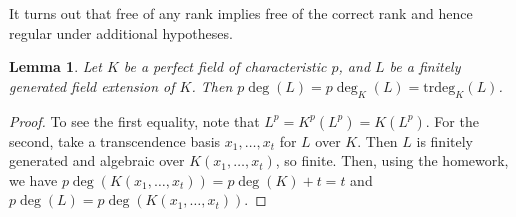 \documentclass{amsart}[12pt]
\numberwithin{equation}{section}
\theoremstyle{plain} %
\newtheorem{lem}[equation]{Lemma}
\theoremstyle{definition}
\theoremstyle{remark}
\begin{document}
It turns out that free of any rank implies free of the correct rank and hence regular under additional hypotheses.

\begin{lem} Let $K$ be a perfect field of characteristic $p$, and $L$ be a finitely generated field extension of $K$. Then $p\deg(L) = p\deg_K(L) = \mathrm{trdeg}_K(L)$.
\end{lem}
\begin{proof} To see the first equality, note that $L^p = K^p(L^p) = K(L^p)$. For the second, take a transcendence basis $x_1,\dots,x_t$ for $L$ over $K$. Then $L$ is finitely generated and algebraic over $K(x_1,\dots,x_t)$, so finite. Then, using the homework, we have $p\deg(K(x_1,\dots,x_t)) = p\deg(K) + t = t$ and $p\deg(L) = p\deg(K(x_1,\dots,x_t))$.
\end{proof}
\end{document}
